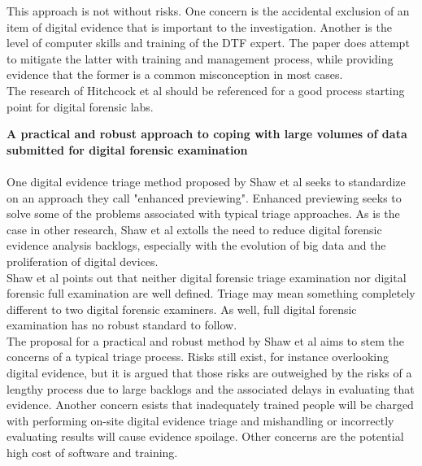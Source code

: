 \documentclass[12pt]{article}
\begin{document}
This approach is not without risks.  One concern is the accidental exclusion of an item of digital evidence that is
important to the investigation.  Another is the level of computer skills and training of the DTF expert.  The paper
does attempt to mitigate the latter with training and management process, while providing evidence that the former
is a common misconception in most cases.\\

The research of Hitchcock et al\cite{hitchcock2016tiered} should be referenced for a good process starting point for
digital forensic labs.
\vspace{0.5 cm}

\textbf{A practical and robust approach to coping with large volumes of data submitted for digital forensic examination \cite{shaw2013practical}}\\
\\

One digital evidence triage method proposed by Shaw et al\cite{shaw2013practical} seeks to standardize on an 
approach they call "enhanced previewing".  Enhanced previewing seeks to solve some of the problems associated with
typical triage approaches.  As is the case in other research, Shaw et al\cite{shaw2013practical} extolls the 
need to reduce digital forensic evidence analysis backlogs, especially with the evolution of big data and the
proliferation of digital devices.\\

Shaw et al\cite{shaw2013practical} points out that neither digital forensic triage examination nor digital forensic
full examination are well defined.  Triage may mean something completely different to two digital forensic
examiners.  As well, full digital forensic examination has no robust standard to follow.\\

The proposal for a practical and robust method by Shaw et al\cite{shaw2013practical} aims to stem the concerns
of a typical triage process.  Risks still exist, for instance overlooking digital evidence, but it is argued that
those risks are outweighed by the risks of a lengthy process due to large backlogs and the associated delays in
evaluating that evidence.  Another concern esists that inadequately trained people will be charged with performing
on-site digital evidence triage and mishandling or incorrectly evaluating results will cause evidence spoilage.
Other concerns are the potential high cost of software and training.\\
\end{document}

